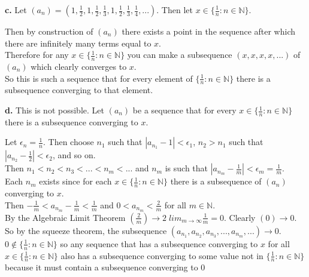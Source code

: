 \documentclass{article}
\begin{document}
{\Large \textbf{c.}} Let $(a_n) = (1,\frac{1}{2},1,\frac{1}{2},\frac{1}{3}, 1,\frac{1}{2},\frac{1}{3},\frac{1}{4}, ...)$. Then let $x\in\{\frac{1}{n} : n\in\mathbb{N}\}$.
\begin{center}
    \doublespacing
    Then by construction of $(a_n)$ there exists a point in the sequence after which there are infinitely many terms equal to $x$.
    \\Therefore for any $x\in\{\frac{1}{n} : n\in\mathbb{N}\}$ you can make a subsequence $(x, x, x, x, ...)$ of $(a_n)$ which clearly converges to $x$.
    \\So this is such a sequence that for every element of $\{\frac{1}{n} : n\in\mathbb{N}\}$ there is a subsequence converging to that element.
\end{center}

{\Large \textbf{d.}} This is not possible. Let $(a_n)$ be a sequence that for every $x\in\{\frac{1}{n} : n\in\mathbb{N}\}$ there is a subsequence converging to $x$.
\begin{center}
    \doublespacing
    Let $\epsilon _n =\frac{1}{n}$. Then choose $n_1$ such that $|a_{n_1} - 1| <\epsilon _1$, $n_2 > n_1$ such that $|a_{n_2} - \frac{1}{2}| <\epsilon _2$, and so on.
    \\Then $n_1 < n_2 < n_3 < ... < n_m < ...$ and $n_m$ is such that $|a_{n_m} -\frac{1}{m}| <\epsilon _m =\frac{1}{m}$.
    \\Each $n_m$ exists since for each $x\in\{\frac{1}{n} : n\in\mathbb{N}\}$ there is a subsequence of $(a_n)$ converging to $x$.
    \\Then $-\frac{1}{m} < a_{n_m} -\frac{1}{m} <\frac{1}{m}$ and $0 < a_{n_m} <\frac{2}{m}$ for all $m\in\mathbb{N}$.
    \\By the Algebraic Limit Theorem $(\frac{2}{m})\rightarrow 2\;lim_{m\rightarrow\infty}\frac{1}{m} = 0$. Clearly $(0)\rightarrow 0$.
    \\So by the squeeze theorem, the subsequence $(a_{n_1}, a_{n_2}, a_{n_3}, ..., a_{n_m}, ...)\rightarrow 0$.
    \\$0\notin\{\frac{1}{n} : n\in\mathbb{N}\}$ so any sequence that has a subsequence converging to $x$ for all $x\in\{\frac{1}{n} : n\in\mathbb{N}\}$ also has a subsequence converging to some value not in $\{\frac{1}{n} : n\in\mathbb{N}\}$ because it must contain a subsequence converging to 0 \qedsymbol
\end{center}


\newpage
\end{document}
